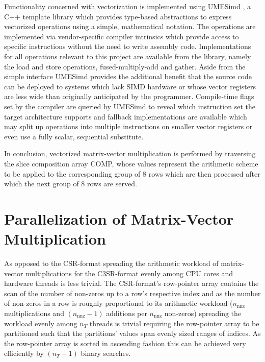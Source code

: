     Functionality concerned with vectorization is implemented using UMESimd \cite{umesimd2017}, a C++ template library
    which provides type-based abstractions to express vectorized operations using a simple, mathematical notation. The
    operations are implemented via vendor-specific compiler intrinsics which provide access to specific instructions
    without the need to write assembly code. Implementations for all operations relevant to this project are available
    from the library, namely the load and store operations, fused-multiply-add and gather. Aside from the simple
    interface UMESimd provides the additional benefit that the source code can be deployed to systems which lack SIMD
    hardware or whose vector registers are less wide than originally anticipated by the programmer. Compile-time flags
    set by the compiler are queried by UMESimd to reveal which instruction set the target architecture supports and
    fallback implementations are available which may split up operations into multiple instructions on smaller vector
    registers or even use a fully scalar, sequential substitute.

    In conclusion, vectorized matrix-vector multiplication is performed by traversing the slice composition array
    COMP, whose values represent the arithmetic scheme to be applied to the corresponding group of $8$ rows which are
    then processed after which the next group of $8$ rows are served.

  \section{Parallelization of Matrix-Vector Multiplication}

    As opposed to the CSR-format spreading the arithmetic workload of matrix-vector multiplications for the C3SR-format
    evenly among CPU cores and hardware threads is less trivial. The CSR-format's row-pointer array contains the scan of
    the number of non-zeros up to a row's respective index and as the number of non-zeros in a row is roughly
    proportional to its arithmetic workload ($n_\text{nnz}$ multiplications and $(n_\text{nnz} - 1)$ additions per
    $n_\text{nnz}$ non-zeros) spreading the workload evenly among $n_T$ threads is trivial requiring the row-pointer
    array to be partitioned such that the partitions' values span evenly sized ranges of indices. As the row-pointer
    array is sorted in ascending fashion this can be achieved very efficiently by $(n_T - 1)$ binary searches.

